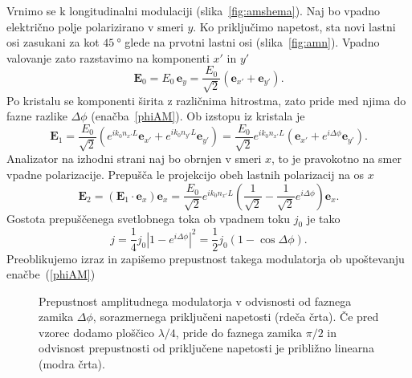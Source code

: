 Vrnimo se k longitudinalni
modulaciji (slika~\ref{fig:amshema}).
Naj bo vpadno električno polje polarizirano v smeri $y$. 
Ko priključimo napetost, sta novi lastni osi zasukani 
za kot $45~\si{\degree}$ glede na prvotni lastni osi (slika~\ref{fig:amn}). Vpadno 
valovanje zato razstavimo na komponenti $x'$ in $y'$
\begin{equation}
\mathbf{E}_0 = E_0\, \mathbf{e}_y = \frac{E_0}{\sqrt{2}}\left(\mathbf{e}_{x'} + \mathbf{e}_{y'}\right).
\end{equation}
Po kristalu se komponenti širita z različnima hitrostma, zato pride med njima do 
fazne razlike $\Delta \phi$ 
(enačba~\ref{phiAM}). Ob izstopu iz kristala je 
\begin{equation}
\mathbf{E}_1 = \frac{E_0}{\sqrt{2}}\left(e^{ik_0 n_{x'}L}\mathbf{e}_{x'} + 
e^{ik_0 n_{y'}L}\mathbf{e}_{y'}\right)
= \frac{E_0}{\sqrt{2}}e^{ik_0 n_{x'}L}\left(\mathbf{e}_{x'} + 
e^{i\Delta\phi}\mathbf{e}_{y'}\right).
\end{equation}
Analizator na izhodni strani naj bo obrnjen v smeri $x$, to je pravokotno
na smer vpadne polarizacije. Prepušča le projekcijo obeh lastnih polarizacij
na os $x$
\begin{equation}
\mathbf{E}_2= \left(\mathbf{E}_1 \cdot \mathbf{e}_x\right)\mathbf{e}_x = 
\frac{E_0}{\sqrt{2}}e^{ik_0 n_{x'}L}
\left(\frac{1}{\sqrt{2}} -\frac{1}{\sqrt{2}} e^{i\Delta\phi}\right)\mathbf{e}_x .
\label{7.16}
\end{equation}
Gostota prepuščenega svetlobnega toka ob vpadnem toku $j_0$ je tako 
\begin{equation}
j=\frac{1}{4}j_{0}\left|1-e^{i\Delta\phi}\right|^{2}=\frac{1}{2}j_{0}(1-\cos\Delta\phi).
\label{7.17}
\end{equation}
Preoblikujemo izraz in zapišemo prepustnost takega modulatorja ob upoštevanju 
enačbe~(\ref{phiAM})
\begin{figure}[h]
\centering
\def\svgwidth{70truemm} 

\caption{Prepustnost amplitudnega modulatorja v odvisnosti od faznega zamika $\Delta \phi$, 
sorazmernega priključeni napetosti (rdeča črta). Če pred vzorec dodamo ploščico $\lambda/4$, 
pride do faznega zamika $\pi/2$ in odvisnost prepustnosti od priključene napetosti
je približno linearna (modra črta).}
\label{fig:amt}
\end{figure}


